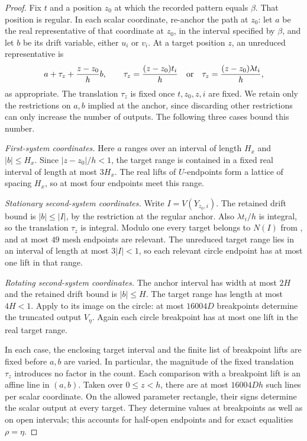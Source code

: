 \begin{proof}
Fix $t$ and a position $z_0$ at which the recorded pattern equals
$\beta$. That position is regular. In each scalar coordinate,
re-anchor the path at $z_0$: let $a$ be the real representative of
that coordinate at $z_0$, in the interval specified by $\beta$,
and let $b$ be its drift variable, either $u_i$ or $v_i$.
At a target position $z$, an unreduced representative is
\begin{equation}\label{count:anchored-scalar}
 a+\tau_z+\frac{z-z_0}{h}b,
 \qquad
 \tau_z=\frac{(z-z_0)t_i}{h}
 \quad\hbox{or}\quad
 \tau_z=\frac{(z-z_0)\lambda t_i}{h},
\end{equation}
as appropriate. The translation $\tau_z$ is fixed once $t,z_0,z,i$
are fixed. We retain only the restrictions on $a,b$ implied at the
anchor, since discarding other restrictions can only increase the
number of outputs. The following three cases bound this number.

\emph{First-system coordinates.} Here $a$ ranges over an interval of length
$H_x$ and $|b|\le H_x$. Since $|z-z_0|/h<1$, the target range
is contained in a fixed real interval of length at most $3H_x$.
The real lifts of $U$-endpoints form a lattice of spacing $H_x$,
so at most four endpoints meet this range.

\emph{Stationary second-system coordinates.} Write $I=V(Y_{z_0,i})$.
The retained drift bound is $|b|\le |I|$, by the restriction at
the regular anchor. Also $\lambda t_i/h$ is integral, so the
translation $\tau_z$ is integral. Modulo one every target belongs
to $N(I)$ from , and at most $49$ mesh endpoints
are relevant. The unreduced target range lies in an interval of
length at most $3|I|<1$, so each relevant circle endpoint has at
most one lift in that range.

\emph{Rotating second-system coordinates.} The anchor interval has
width at most $2H$ and the retained drift bound is $|b|\le H$.
The target range has length at most $4H<1$. Apply
 to its image on the circle: at most $16004D$
breakpoints determine the truncated output $V_\eta$. Again each
circle breakpoint has at most one lift in the real target range.

In each case, the enclosing target interval and the finite list of
breakpoint lifts are fixed before $a,b$ are varied. In particular,
the magnitude of the fixed translation $\tau_z$ introduces no
factor in the count. Each comparison with a breakpoint lift is an
affine line in $(a,b)$. Taken over $0\le z<h$, there are at most
$16004Dh$ such lines per scalar coordinate. On the allowed parameter
rectangle, their signs determine the scalar output at every target.
They determine values at breakpoints as well as on open intervals;
this accounts for half-open endpoints and for exact equalities
$\rho=\eta$.


\end{proof}
